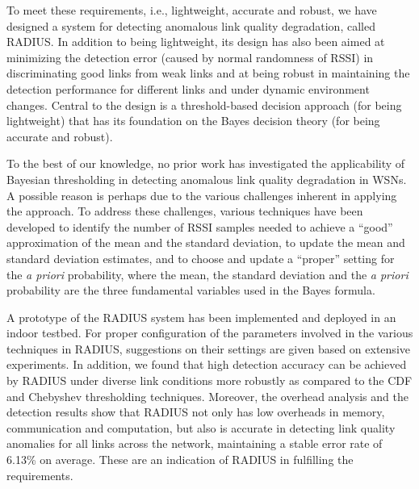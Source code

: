 To meet these requirements, i.e., lightweight, accurate and robust, we have designed a system for detecting anomalous link quality degradation, called RADIUS. In addition to being lightweight, its design has also been aimed at minimizing the detection error (caused by normal randomness of RSSI) in discriminating good links from weak links and at being robust in maintaining the detection performance for different links and under dynamic environment changes. Central to the design is a threshold-based decision approach (for being lightweight) that has its foundation on the Bayes decision theory (for being accurate and robust). 

To the best of our knowledge, no prior work has investigated the applicability of Bayesian thresholding in detecting anomalous link quality degradation in WSNs. A possible reason is perhaps due to the various challenges inherent in applying the approach. To address these challenges, various techniques have been developed to identify the number of RSSI samples needed to achieve a ``good'' approximation of the mean and the standard deviation, to update the mean and standard deviation estimates, and to choose and update a ``proper'' setting for the \textit{a priori} probability, where the mean, the standard deviation and the \textit{a priori} probability are the three fundamental variables used in the Bayes formula. 

  

A prototype of the RADIUS system has been implemented and deployed in an indoor testbed. For proper configuration of the parameters involved in the various techniques in RADIUS, suggestions on their settings are given based on extensive experiments. In addition, we found that high detection accuracy can be achieved by RADIUS under diverse link conditions more robustly as compared to the CDF and Chebyshev thresholding techniques. Moreover, the overhead analysis and the detection results show that RADIUS not only has low overheads in memory, communication and computation, but also is accurate in detecting link quality anomalies for all links across the network, maintaining a stable error rate of 6.13\% on average. These are an indication of RADIUS in fulfilling the requirements. 


